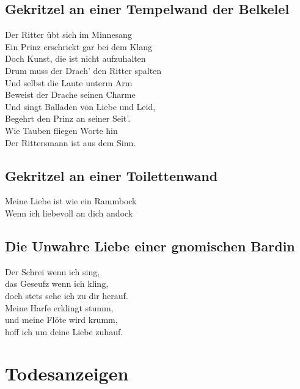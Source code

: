 \documentclass[final]{multiversum}
\begin{document}
\subsection{Gekritzel an einer Tempelwand der Belkelel}
Der Ritter übt sich im Minnesang\\
Ein Prinz erschrickt gar bei dem Klang\\
Doch Kunst, die ist nicht aufzuhalten\\
Drum muss der Drach' den Ritter spalten\\
Und selbst die Laute unterm Arm\\
Beweist der Drache seinen Charme\\
Und singt Balladen von Liebe und Leid,\\
Begehrt den Prinz an seiner Seit'.\\
Wie Tauben fliegen Worte hin\\
Der Rittersmann ist aus dem Sinn.\\

\subsection{Gekritzel an einer Toilettenwand}
Meine Liebe ist wie ein Rammbock\\
Wenn ich liebevoll an dich andock\\

\subsection{Die Unwahre Liebe einer gnomischen Bardin}
\begin{center}
      Der Schrei wenn ich sing,\\
      das Geseufz wenn ich kling,\\
      doch stets sehe ich zu dir herauf.\\
      Meine Harfe erklingt stumm,\\
      und meine Flöte wird krumm,\\
      hoff ich um deine Liebe zuhauf.\\
\end{center}



\section{Todesanzeigen}
\end{document}
